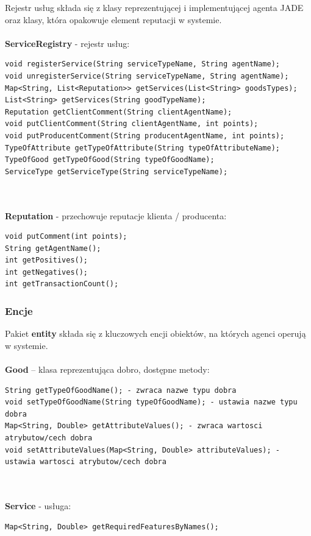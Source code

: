 \documentclass[a4paper,12pt]{article}
\begin{document}
Rejestr usług składa się z klasy reprezentującej i implementującej agenta JADE oraz klasy, która opakowuje element reputacji w systemie.
\\ \\
\textbf{ServiceRegistry} - rejestr usług:
\begin{lstlisting}
void registerService(String serviceTypeName, String agentName);
void unregisterService(String serviceTypeName, String agentName);
Map<String, List<Reputation>> getServices(List<String> goodsTypes);
List<String> getServices(String goodTypeName);
Reputation getClientComment(String clientAgentName);
void putClientComment(String clientAgentName, int points);
void putProducentComment(String producentAgentName, int points);
TypeOfAttribute getTypeOfAttribute(String typeOfAttributeName);
TypeOfGood getTypeOfGood(String typeOfGoodName);
ServiceType getServiceType(String serviceTypeName);
\end{lstlisting}
\\ \\
\textbf{Reputation} - przechowuje reputacje klienta / producenta:
\begin{lstlisting}
void putComment(int points);
String getAgentName();
int getPositives();
int getNegatives();
int getTransactionCount();
\end{lstlisting}

\subsubsection{Encje}

Pakiet \textbf{entity} składa się z kluczowych encji obiektów, na których agenci operują w systemie.
\\ \\
\textbf{Good} – klasa reprezentująca dobro, dostępne metody:
\begin{lstlisting}
String getTypeOfGoodName(); - zwraca nazwe typu dobra
void setTypeOfGoodName(String typeOfGoodName); - ustawia nazwe typu dobra
Map<String, Double> getAttributeValues(); - zwraca wartosci atrybutow/cech dobra
void setAttributeValues(Map<String, Double> attributeValues); - ustawia wartosci atrybutow/cech dobra
\end{lstlisting}
\\ \\
\textbf{Service} - usługa:
\begin{lstlisting}
Map<String, Double> getRequiredFeaturesByNames();
\end{lstlisting}
\end{document}

